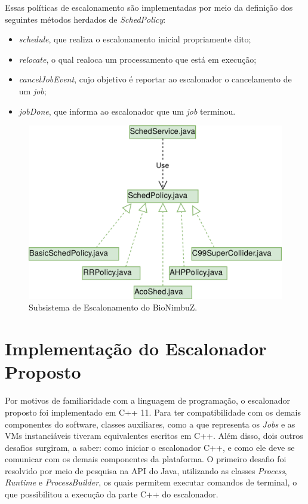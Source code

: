 Essas políticas de escalonamento são implementadas por meio da definição dos seguintes métodos herdados de \textit{SchedPolicy}:
\begin{itemize}
	\item \textit{schedule}, que realiza o escalonamento inicial propriamente dito;
	\item \textit{relocate}, o qual realoca um processamento que está em execução;
	\item \textit{cancelJobEvent}, cujo objetivo é reportar ao escalonador o cancelamento de um \textit{job};
	\item \textit{jobDone}, que informa ao escalonador que um \textit{job} terminou.
\end{itemize}

\begin{figure}[htbp]
	\centerline{\includegraphics[width=12cm]{img/ArquiteturaAntesHoriz.png}}
	\caption{Subsistema de Escalonamento do BioNimbuZ.}
	\label{ArquiteturaAtual}
\end{figure}


\section{Implementação do Escalonador Proposto}

Por motivos de familiaridade com a linguagem de programação, o escalonador proposto foi implementado em C++ 11. Para ter compatibilidade com os demais componentes do software, classes auxiliares, como a que representa os \textit{Jobs} e as \acrshort{VM}s instanciáveis tiveram equivalentes escritos em C++. Além disso, dois outros desafios surgiram, a saber: como iniciar o escalonador C++, e como ele deve se comunicar com os demais componentes da plataforma. O primeiro desafio foi resolvido por meio de pesquisa na \acrfull{API} do Java, utilizando as classes \textit{Process}\cite{JavaProcess}, \textit{Runtime}\cite{JavaRuntime} e \textit{ProcessBuilder}\cite{JavaProcessBuilder}, os quais permitem executar comandos de terminal, o que possibilitou a execução da parte C++ do escalonador.

